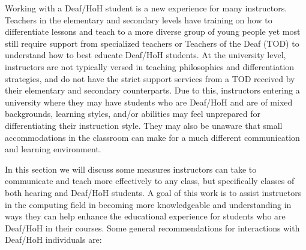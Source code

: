 \documentclass[conference]{IEEEtran}
\begin{document}
Working with a Deaf/HoH student is a new experience for many instructors. Teachers in the elementary and secondary levels have training on how to differentiate lessons and teach to a more diverse group of young people yet most still require support from specialized teachers or Teachers of the Deaf (TOD) to understand how to best educate Deaf/HoH students. At the university level, instructors are not typically versed in teaching philosophies and differentiation strategies, and do not have the strict support services from a TOD received by their elementary and secondary counterparts. Due to this, instructors entering a university where they may have students who are Deaf/HoH and are of mixed backgrounds, learning styles, and/or abilities may feel unprepared for differentiating their instruction style. They may also be unaware that small accommodations in the classroom can make for a much different communication and learning environment.

In this section we will discuss some measures instructors can take to communicate and teach more effectively to any class, but specifically classes of both hearing and Deaf/HoH students. A goal of this work is to assist instructors in the computing field in becoming more knowledgeable and understanding in ways they can help enhance the educational experience for students who are Deaf/HoH in their courses. Some general recommendations for interactions with Deaf/HoH individuals are:

\end{document}
